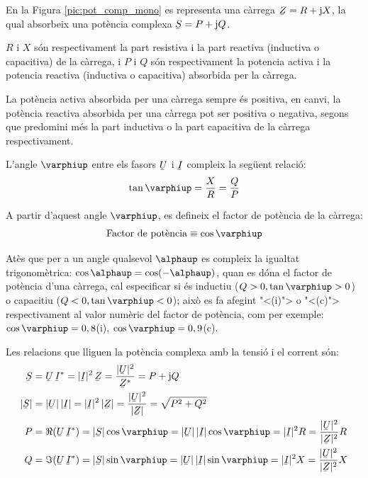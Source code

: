 En la Figura \vref{pic:pot_comp_mono} es representa una c\`{a}rrega $\cmplx{Z}=R+\ju X$, la
qual absorbeix una pot\`{e}ncia complexa $\cmplx{S} = P + \ju Q$.
\begin{center}
    
    \label{pic:pot_comp_mono}
\end{center}

$R$ i $X$ s\'{o}n respectivament la part resistiva i la part reactiva
(inductiva o capacitiva) de la c\`{a}rrega, i $P$ i $Q$ s\'{o}n
respectivament la potencia activa i la potencia reactiva (inductiva
o capacitiva) absorbida per la c\`{a}rrega.

La pot\`{e}ncia activa absorbida per una c\`{a}rrega sempre \'{e}s positiva, en
canvi, la pot\`{e}ncia reactiva absorbida per una c\`{a}rrega pot ser
positiva o negativa, segons que predomini m\'{e}s la part inductiva o la
part capacitiva de la c\`{a}rrega respectivament.

L'angle $\varphiup$ entre els fasors $\cmplx{U}$ i $\cmplx{I}$ compleix la seg\"{u}ent relaci\'{o}:
\begin{equation}
   \tan\varphiup = \frac{X}{R} = \frac{Q}{P}
\end{equation}

A partir d'aquest angle $\varphiup$, es
defineix el factor de pot\`{e}ncia de la c\`{a}rrega:
\begin{equation}
   \text{Factor de pot\`{e}ncia} \equiv \cos\varphiup
\end{equation}

At\`{e}s que per a un angle qualsevol $\alphaup$ es compleix la igualtat
trigonom\`{e}trica: $\cos\alphaup = \cos(-\alphaup)$, quan es d\'{o}na el factor
de pot\`{e}ncia d'una c\`{a}rrega, cal especificar si \'{e}s inductiu ($Q>0,
\tan\varphiup>0$) o capacitiu ($Q<0, \tan\varphiup<0$); aix\`{o} es fa
afegint {"<}(i){">} o {"<}(c){">} respectivament al valor num\`{e}ric del factor
de pot\`{e}ncia, com per exemple: $\cos\varphiup=0,8$(i),
$\cos\varphiup=0,9$(c).

Les relacions que lliguen la pot\`{e}ncia complexa amb la tensi\'{o} i el corrent s\'{o}n:
\begin{align}
   \cmplx{S} &=  \cmplx{U} \,\cmplx{I}^* =
   |\cmplx{I}|^2 \,\cmplx{Z} = \frac{|\cmplx{U}|^2}{\cmplx{Z}^*} =
   P + \ju Q \label{eq:s_mono1}\\
   |\cmplx{S}| &= |\cmplx{U}| \,|\cmplx{I}| =
   |\cmplx{I}|^2 \,|\cmplx{Z}| = \frac{|\cmplx{U}|^2}{|\cmplx{Z}|} =
   \sqrt{P^2+Q^2} \\
   P &= \Re (\cmplx{U} \, \cmplx{I}^*) = |\cmplx{S}| \cos\varphiup =
   |\cmplx{U}|\, |\cmplx{I}| \cos\varphiup = |\cmplx{I}|^2 R =
   \frac{|\cmplx{U}|^2}{|\cmplx{Z}|^2}R\\
   Q &= \Im (\cmplx{U} \, \cmplx{I}^*) = |\cmplx{S}| \sin\varphiup =
   |\cmplx{U}| \,|\cmplx{I}|\sin\varphiup  = |\cmplx{I}|^2 X =
   \frac{|\cmplx{U}|^2}{|\cmplx{Z}|^2}X
\end{align}


